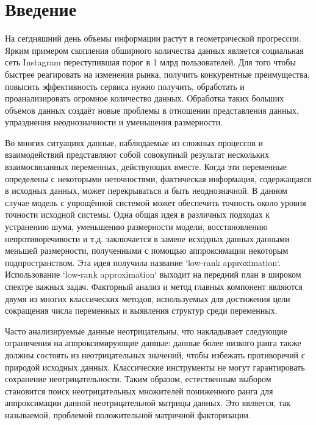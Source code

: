 
\newpage
\section{Введение}


На сегдняшний день объемы информации растут в геометрической прогрессии.
Ярким примером  скопления обширного количества данных является социальная сеть Instagram переступившая порог в 1 млрд пользователей.
Для того чтобы быстрее реагировать на изменения рынка, получить конкурентные преимущества,
повысить эффективность сервиса нужно получить, обработать и проанализировать огромное количество данных.
Обработка таких больших объемов данных создаёт новые проблемы в отношении представления данных,
упразднения неоднозначности и уменьшения размерности.

Во многих ситуациях данные, наблюдаемые из сложных процессов и взаимодействий
представляют собой совокупный результат нескольких взаимосвязанных переменных, действующих вместе.
Когда эти переменные определены с некоторыми неточностями, фактическая информация, содержащаяся в исходных данных,
может перекрываться и быть неоднозначной.
В данном случае модель с упрощённой системой может обеспечить точность около уровня точности исходной системы.
Одна общая идея в различных подходах к устранению шума, уменьшению размерности модели,
восстановлению непротиворечивости и т.д. заключается в замене исходных данных данными меньшей размерности,
полученными с помощью аппроксимации некоторым подпространством.
Эта идея получила название `low-rank approximation`.
Использование `low-rank approximation` выходит на передний план в широком спектре важных задач.
Факторный анализ и метод главных компонент являются двумя из многих классических методов,
используемых для достижения цели сокращения числа переменных и выявления структур среди переменных.

Часто анализируемые данные неотрицательны, что накладывает следующие ограничения на аппроксимирующие данные:
данные более низкого ранга также должны состоять из неотрицательных значений, чтобы избежать противоречий с природой исходных данных.
Классические инструменты не могут гарантировать сохранение неотрицательности.
Таким образом, естественным выбором становится поиск неотрицательных множителей пониженного ранга для аппроксимации данной неотрицательной матрицы данных.
Это является, так называемой, проблемой положительной матричной факторизации.
